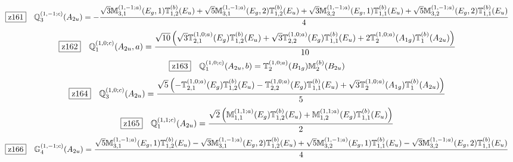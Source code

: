 \documentclass[fleqn,10pt,landscape]{jsarticle}
\begin{document}
\begin{dmath*}
\hspace*{3mm}\fbox{z161}\quad \mathbb{Q}_{3}^{(1,-1;c)}(A_{2u})=- \frac{\sqrt{3} \mathbb{M}_{3,1}^{(1,-1;a)}(E_{g},1) \mathbb{T}_{1,2}^{(b)}(E_{u}) + \sqrt{5} \mathbb{M}_{3,1}^{(1,-1;a)}(E_{g},2) \mathbb{T}_{1,2}^{(b)}(E_{u}) + \sqrt{3} \mathbb{M}_{3,2}^{(1,-1;a)}(E_{g},1) \mathbb{T}_{1,1}^{(b)}(E_{u}) + \sqrt{5} \mathbb{M}_{3,2}^{(1,-1;a)}(E_{g},2) \mathbb{T}_{1,1}^{(b)}(E_{u})}{4}
\end{dmath*}
\begin{dmath*}
\hspace*{3mm}\fbox{z162}\quad \mathbb{Q}_{1}^{(1,0;c)}(A_{2u},a)=\frac{\sqrt{10} \left(\sqrt{3} \mathbb{T}_{2,1}^{(1,0;a)}(E_{g}) \mathbb{T}_{1,2}^{(b)}(E_{u}) + \sqrt{3} \mathbb{T}_{2,2}^{(1,0;a)}(E_{g}) \mathbb{T}_{1,1}^{(b)}(E_{u}) + 2 \mathbb{T}_{2}^{(1,0;a)}(A_{1g}) \mathbb{T}_{1}^{(b)}(A_{2u})\right)}{10}
\end{dmath*}
\begin{dmath*}
\hspace*{3mm}\fbox{z163}\quad \mathbb{Q}_{1}^{(1,0;c)}(A_{2u},b)=\mathbb{T}_{2}^{(1,0;a)}(B_{1g}) \mathbb{M}_{2}^{(b)}(B_{2u})
\end{dmath*}
\begin{dmath*}
\hspace*{3mm}\fbox{z164}\quad \mathbb{Q}_{3}^{(1,0;c)}(A_{2u})=\frac{\sqrt{5} \left(- \mathbb{T}_{2,1}^{(1,0;a)}(E_{g}) \mathbb{T}_{1,2}^{(b)}(E_{u}) - \mathbb{T}_{2,2}^{(1,0;a)}(E_{g}) \mathbb{T}_{1,1}^{(b)}(E_{u}) + \sqrt{3} \mathbb{T}_{2}^{(1,0;a)}(A_{1g}) \mathbb{T}_{1}^{(b)}(A_{2u})\right)}{5}
\end{dmath*}
\begin{dmath*}
\hspace*{3mm}\fbox{z165}\quad \mathbb{Q}_{1}^{(1,1;c)}(A_{2u})=\frac{\sqrt{2} \left(\mathbb{M}_{1,1}^{(1,1;a)}(E_{g}) \mathbb{T}_{1,2}^{(b)}(E_{u}) + \mathbb{M}_{1,2}^{(1,1;a)}(E_{g}) \mathbb{T}_{1,1}^{(b)}(E_{u})\right)}{2}
\end{dmath*}
\begin{dmath*}
\hspace*{3mm}\fbox{z166}\quad \mathbb{G}_{4}^{(1,-1;c)}(A_{2u})=\frac{\sqrt{5} \mathbb{M}_{3,1}^{(1,-1;a)}(E_{g},1) \mathbb{T}_{1,2}^{(b)}(E_{u}) - \sqrt{3} \mathbb{M}_{3,1}^{(1,-1;a)}(E_{g},2) \mathbb{T}_{1,2}^{(b)}(E_{u}) + \sqrt{5} \mathbb{M}_{3,2}^{(1,-1;a)}(E_{g},1) \mathbb{T}_{1,1}^{(b)}(E_{u}) - \sqrt{3} \mathbb{M}_{3,2}^{(1,-1;a)}(E_{g},2) \mathbb{T}_{1,1}^{(b)}(E_{u})}{4}
\end{dmath*}
\end{document}
